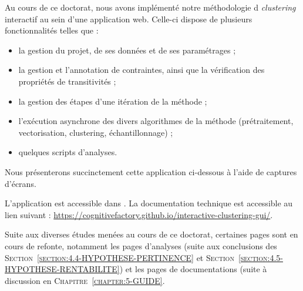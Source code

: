 \label{annex:C-ANNEXE-WEB-APPLICATION}
	
	Au cours de ce doctorat, nous avons implémenté notre méthodologie d \textit{clustering} interactif au sein d'une application web.
	Celle-ci dispose de plusieurs fonctionnalités telles que :
	\begin{itemize}
		\item la gestion du projet, de ses données et de ses paramétrages ;
		\item la gestion et l'annotation de contraintes, ainsi que la vérification des propriétés de transitivités ;
		\item la gestion des étapes d'une itération de la méthode ;
		\item l'exécution asynchrone des divers algorithmes de la méthode (prétraitement, vectorisation, clustering, échantillonnage) ;
		\item quelques scripts d'analyses.
	\end{itemize}
	
	Nous présenterons succinctement cette application ci-dessous à l'aide de captures d'écrans.
	
	\begin{leftBarInformation}
		L'application est accessible dans \cite{schild-etal:2022:cognitivefactory-interactiveclusteringgui}.
		La documentation technique est accessible au lien suivant : \url{https://cognitivefactory.github.io/interactive-clustering-gui/}.
	\end{leftBarInformation}
	
	\begin{leftBarAuthorOpinion}
		Suite aux diverses études menées au cours de ce doctorat, certaines pages sont en cours de refonte, notamment les pages d'analyses (suite aux conclusions des \textsc{Section~\ref{section:4.4-HYPOTHESE-PERTINENCE}} et \textsc{Section~\ref{section:4.5-HYPOTHESE-RENTABILITE}}) et les pages de documentations (suite à discussion en \textsc{Chapitre~\ref{chapter:5-GUIDE}}.
	\end{leftBarAuthorOpinion}
	
